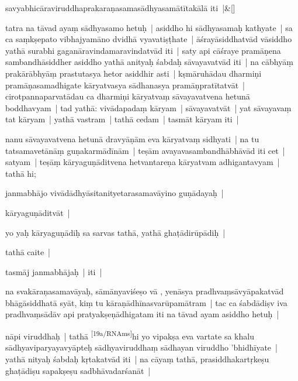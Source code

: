 \documentclass[article,a4paper]{memoir}
\newcommand{\deletion}[1]{($^{-}$#1)}
\begin{document}
	    
	    \stanza[\smallbreak]
savyabhicā\-raviruddhaprakaraṇasamasā\-dhyasamā\-tī\-takā\-lā\- iti |\&[\smallbreak]


	

	  \pstart tatra na tā\-vad ayaṃ sā\-dhyasamo hetuḥ | asiddho hi sā\-dhyasamaḥ kathyate | sa ca saṃkṣepato vibhajyamā\-no dvidhā\- vyavatiṣṭhate | ā\-śrayā\-siddhatvā\-d vā\-siddho yathā\- surabhi gaganā\-ravindamaravindatvā\-d iti | saty api cā\-śraye pramā\-ṇena sambandhā\-siddher asiddho yathā\- anityaḥ śabdaḥ sā\-vayavatvā\-d iti | na cā\-bhyā\-ṃ prakā\-rā\-bhyā\-ṃ prastutasya hetor asiddhir asti | \label{ratnakīrtinibandhāvali__36r1N54T2H6NLF3JHCUF8B8TWUQ}kṣmā\-ruhā\-dau dharmiṇi pramā\-ṇasamadhigate kā\-ryatvasya sā\-dhanasya pramā\-ṇpratī\-tatvā\-t | cirotpannaparvatā\-dau ca dharmiṇi kā\-ryatvaṃ sā\-vayavatvena hetunā\- boddhavyam | tad yathā\-: vivā\-dapadaṃ kā\-ryam | sā\-vayavatvā\-t | yat sā\-vayavaṃ tat kā\-ryam | yathā\- vastram | tathā\- cedam | tasmā\-t kā\-ryam iti |
	\pend
      

	  \pstart nanu sā\-vayavatvena hetunā\- dravyā\-ṇā\-m eva kā\-ryatvaṃ sidhyati | na tu tatsamavetā\-nā\-ṃ guṇakarmā\-dī\-nā\-m | teṣā\-m avayavasambandhā\-bhā\-vā\-d iti cet | satyam | teṣā\-ṃ kā\-ryaguṇā\-ditvena hetvantareṇa kā\-ryatvam adhigantavyam | tathā\- hi; 
	\pend
      

	  \pstart janmabhā\-jo vivā\-dā\-dhyā\-sitanityetarasamavā\-yino guṇā\-dayaḥ |
	\pend
      

	  \pstart kā\-ryaguṇā\-ditvā\-t |
	\pend
      

	  \pstart yo yaḥ kā\-ryaguṇā\-diḥ sa sarvas tathā\-, yathā\- ghaṭā\-dirū\-pā\-diḥ |
	\pend
      

	  \pstart tathā\- caite |
	\pend
      

	  \pstart tasmā\-j janmabhā\-jaḥ | iti |
	\pend
      

	  \pstart {} na svakā\-raṇasamavā\-yaḥ, sā\-mā\-nyaviśeṣo vā\- \edtext{}{\lemma{---}\Afootnote{boddhavyaṃ\deletion{ḥ} \cite{}; boddhavyaḥ \cite{}}}, yenā\-sya pradhvaṃsā\-vyā\-pakatvā\-d bhā\-gā\-siddhatā\- syā\-t, kiṃ tu kā\-raṇā\-dhī\-nasvarū\-pamā\-tram | tac ca śabdā\-diṣv iva pradhvaṃsā\-dā\-v api pratyakṣeṇā\-dhigatam iti na tā\-vad ayam asiddho hetuḥ |
	\pend
      

	  \pstart nā\-pi viruddhaḥ | tathā\- \leavevmode\textsuperscript{\rmlatinfont\tiny [19a/RNAms]}\label{RNAms_19a}hi yo vipakṣa eva vartate sa khalu sā\-dhyaviparyayavyā\-pteḥ sā\-dhyaviruddhaṃ sā\-dhayan viruddho 'bhidhī\-yate | yathā\- nityaḥ śabdaḥ kṛtakatvā\-d iti | na cā\-yaṃ tathā\-, prasiddhakartṛkeṣu ghaṭā\-diṣu sapakṣeṣu sadbhā\-vadarśanā\-t |
	\pend
      
\end{document}
